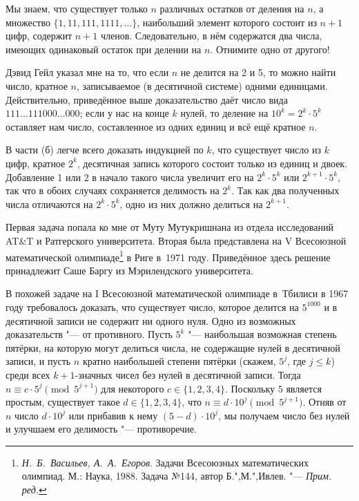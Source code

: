 \documentclass[twoside]{book}
\newcommand\VsMO{\emph{Н.~Б.~Васильев, А.~А.~Егоров}. Задачи Всесоюзных математических олимпиад. М.: Наука, 1988}
\begin{document}
Мы знаем, что существует только $n$ различных остатков от деления на $n$, а множество $\{1, 11, 111, 1111,\dots\}$, наибольший элемент которого состоит из $n+1$ цифр, содержит $n+1$ членов.
Следовательно, в нём содержатся два числа, имеющих одинаковый остаток при делении на $n$.
Отнимите одно от другого!
\heart

\medskip
Дэвид Гейл %
указал мне на то, %
что если $n$ не делится на 2 и 5, то можно найти число, кратное $n$, 
записываемое (в десятичной системе) одними единицами.
Действительно, приведённое выше доказательство даёт число вида $111\dots111000\dots000$; 
если у нас на конце $k$ нулей, то деление на $10^k=2^k\cdot 5^k$ оставляет нам число, составленное из одних единиц и всё ещё кратное $n$.

\medskip

В части (б) легче всего доказать индукцией по $k$, что существует
число из $k$ цифр, кратное $2^k$, десятичная запись которого состоит
только из единиц и двоек.
Добавление 1 или 2 в начало такого числа
увеличит его на $2^k\cdot 5^k$ или $2^{k+1}\cdot 5^k$, так
что в обоих случаях сохраняется делимость на $2^k$.
Так как два
полученных числа отличаются на $2^k\cdot 5^k$, одно из них должно
делиться на $2^{k+1}$. \heart

\medskip
Первая задача попала ко мне от Муту Мутукришнана %
из отдела исследований AT\&T и Ратгерского университета.
Вторая была представлена на V Всесоюзной математической олимпиаде\footnote{%
\VsMO. Задача №144, автор  Б.",М.",Ивлев. "--- \emph{Прим. ред.}}
в Риге в~1971 году.
Приведённое здесь решение принадлежит Саше Баргу %
из Мэрилендского университета.

\medskip

В похожей задаче на I Всесоюзной математической олимпиаде в~Тбилиси в
1967 году требовалось доказать, что существует число, которое делится
на $5^{1000}$ и в десятичной записи не содержит ни
одного нуля.
Одно из возможных доказательств "--- от противного.
Пусть $5^k$ "---
наибольшая возможная степень пятёрки, на которую могут делиться числа, не содержащие нулей в десятичной записи, и пусть
$n$ кратно наибольшей степени пятёрки (скажем, $5^j$, где $j\le k$) среди всех $k+1$-значных чисел без нулей в десятичной записи.
Тогда $n\equiv c\cdot
5^j\pmod{5^{j+1}}$ для некоторого $c\in\{1,2,3,4\}$.
Поскольку $5$
является простым, существует такое $d\in\{1,2,3,4\}$, что $n\equiv
d\cdot 10^j\pmod{5^{j+1}}$.
Отняв от $n$ число $d\cdot 10^{j}$ или
прибавив к нему $(5-d)\cdot 10^{j}$, мы получаем число без нулей и
улучшаем его делимость "--- противоречие. \heart
\end{document}
